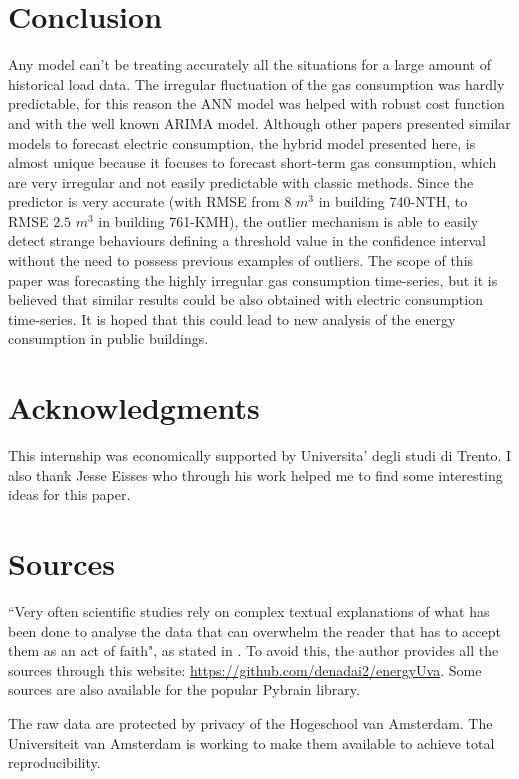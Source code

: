 \documentclass{sig-alternate-sigmod07}
\begin{document}
\section{Conclusion}



Any model can't be treating accurately all the situations for a large amount of historical load data. The irregular fluctuation of the gas consumption was hardly predictable, for this reason the ANN model was helped with robust cost function and with the well known ARIMA model. Although other papers presented similar models to forecast electric consumption, the hybrid model presented here, is almost unique because it focuses to forecast short-term gas consumption, which are very irregular and not easily predictable with classic methods. Since the predictor is very accurate (with RMSE from $8$ $m^3$ in building 740-NTH, to RMSE $2.5$ $m^3$ in building 761-KMH), the outlier mechanism is able to easily detect strange behaviours defining a threshold value in the confidence interval without the need to possess previous examples of outliers. The scope of this paper was forecasting the highly irregular gas consumption time-series, but it is believed that similar results could be also obtained with electric consumption time-series. It is hoped that this could lead to new analysis of the energy consumption in public buildings.



\section{Acknowledgments}
This internship was economically supported by Universita' degli studi di Trento. I also thank Jesse Eisses who through his work helped me to find some interesting ideas for this paper.

%

%
%
\appendix
\section{Sources}
``Very often scientific studies rely on complex textual explanations of what has been done to analyse the data that can overwhelm the reader that has to accept them as an act of faith", as stated in \cite{reproducibility}. To avoid this, the author provides all the sources through this website: \url{https://github.com/denadai2/energyUva}. Some sources are also available for the popular Pybrain \cite{schaul2010} library.

The raw data are protected by privacy of the Hogeschool van Amsterdam. The Universiteit van Amsterdam is working to make them available to achieve total reproducibility.


\balancecolumns %
\end{document}
